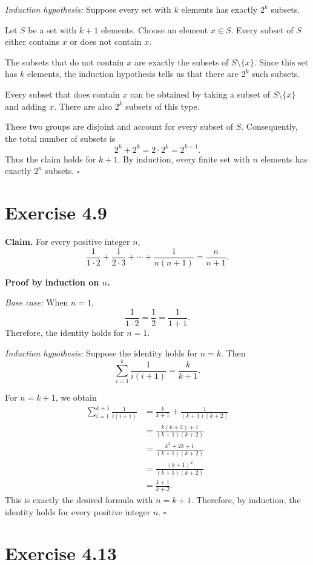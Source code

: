 \documentclass[11pt]{article}
\newcommand{\qed}{\hfill$\square$}
\begin{document}
\textit{Induction hypothesis:} Suppose every set with
$k$ elements has exactly $2^k$ subsets.

Let $S$ be a set with $k+1$ elements. Choose an element
$x\in S$. Every subset of $S$ either contains $x$ or
does not contain $x$.

The subsets that do not contain $x$ are exactly the
subsets of $S\setminus\{x\}$. Since this set has $k$
elements, the induction hypothesis tells us that there
are $2^k$ such subsets.

Every subset that does contain $x$ can be obtained by
taking a subset of $S\setminus\{x\}$ and adding $x$.
There are also $2^k$ subsets of this type.

These two groups are disjoint and account for every
subset of $S$. Consequently, the total number of subsets
is
\[
2^k+2^k=2\cdot 2^k=2^{k+1}.
\]
Thus the claim holds for $k+1$. By induction, every
finite set with $n$ elements has exactly $2^n$ subsets.
\qed

\section*{Exercise 4.9}

\textbf{Claim.} For every positive integer $n$,
\[
\frac{1}{1\cdot2}+\frac{1}{2\cdot3}
+\cdots+\frac{1}{n(n+1)}
=\frac{n}{n+1}.
\]

\textbf{Proof by induction on $n$.}

\textit{Base case:} When $n=1$,
\[
\frac{1}{1\cdot2}=\frac12=\frac{1}{1+1}.
\]
Therefore, the identity holds for $n=1$.

\textit{Induction hypothesis:} Suppose the identity holds
for $n=k$. Then
\[
\sum_{i=1}^{k}\frac{1}{i(i+1)}
=\frac{k}{k+1}.
\]

For $n=k+1$, we obtain
\begin{align*}
\sum_{i=1}^{k+1}\frac{1}{i(i+1)}
&=\frac{k}{k+1}
  +\frac{1}{(k+1)(k+2)}\\
&=\frac{k(k+2)+1}{(k+1)(k+2)}\\
&=\frac{k^2+2k+1}{(k+1)(k+2)}\\
&=\frac{(k+1)^2}{(k+1)(k+2)}\\
&=\frac{k+1}{k+2}.
\end{align*}
This is exactly the desired formula with $n=k+1$.
Therefore, by induction, the identity holds for every
positive integer $n$. \qed

\section*{Exercise 4.13}
\end{document}
